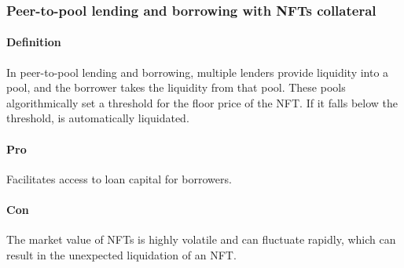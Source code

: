 \subsubsection{Peer-to-pool lending and borrowing with NFTs collateral}
\paragraph{Definition}
In peer-to-pool lending and borrowing, multiple lenders provide liquidity into a pool, and the borrower takes the liquidity from that pool. These pools algorithmically set a threshold for the floor price of the NFT. If it falls below the threshold, is automatically liquidated. 
\paragraph{Pro}
Facilitates access to loan capital for borrowers.
\paragraph{Con}
The market value of NFTs is highly volatile and can fluctuate rapidly, which can result in the unexpected liquidation of an NFT. 
